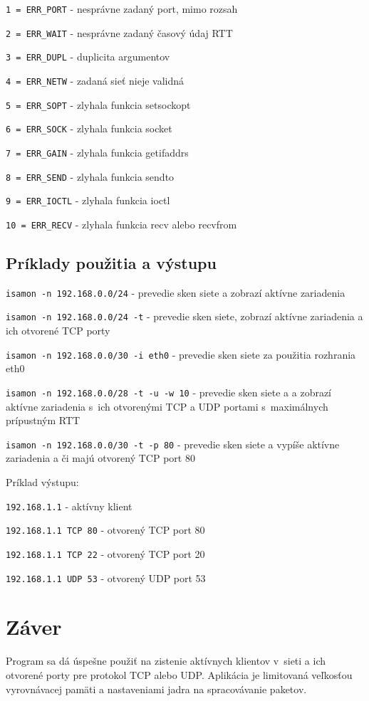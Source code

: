 \texttt{1 = ERR\_PORT} - nesprávne zadaný port, mimo rozsah

\texttt{2 = ERR\_WAIT} - nesprávne zadaný  časový údaj RTT

\texttt{3 = ERR\_DUPL} - duplicita argumentov

\texttt{4 = ERR\_NETW} - zadaná sieť nieje validná

\texttt{5 = ERR\_SOPT} - zlyhala funkcia setsockopt

\texttt{6 = ERR\_SOCK} - zlyhala funkcia socket

\texttt{7 = ERR\_GAIN} - zlyhala funkcia getifaddrs

\texttt{8 = ERR\_SEND} - zlyhala funkcia sendto

\texttt{9 = ERR\_IOCTL} - zlyhala funkcia ioctl

\texttt{10 = ERR\_RECV} - zlyhala funkcia recv alebo recvfrom

\newpage
\section{Príklady použitia a výstupu}


\hspace{6mm}\texttt{isamon -n 192.168.0.0/24} - prevedie sken siete a zobrazí aktívne zariadenia

\texttt{isamon -n 192.168.0.0/24 -t} - prevedie sken siete, zobrazí aktívne zariadenia a ich otvorené TCP porty

\texttt{isamon -n 192.168.0.0/30 -i eth0} - prevedie sken siete za použitia rozhrania eth0

\texttt{isamon -n 192.168.0.0/28 -t -u -w 10} - prevedie sken siete a a zobrazí aktívne zariadenia s~ich otvorenými TCP a UDP portami s~maximálnych prípustným RTT

\texttt{isamon -n 192.168.0.0/30 -t -p 80} - prevedie sken siete a vypíše aktívne zariadenia a či majú otvorený TCP port 80

\vspace{10mm}

Príklad výstupu: 

\texttt{192.168.1.1} - aktívny klient

\texttt{192.168.1.1 TCP 80} - otvorený TCP port 80

\texttt{192.168.1.1 TCP 22} - otvorený TCP port 20

\texttt{192.168.1.1 UDP 53} - otvorený UDP port 53


\chapter{Záver}
Program sa dá úspešne použiť na zistenie aktívnych klientov v~sieti a ich otvorené porty pre protokol TCP alebo UDP. Aplikácia je limitovaná veľkosťou vyrovnávacej pamäti a nastaveniami jadra na spracovávanie paketov. 

